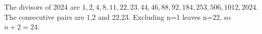 The divisors of 2024 are $1,2,4,8,11,22,23,44,46,88,92,184,253,506,1012,2024$. The consecutive pairs are 1,2 and 22,23. Excluding n=1 leaves n=22, so $n+2=\boxed{24}$.
